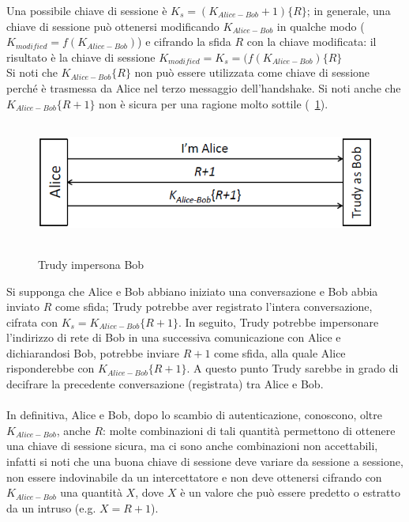 Una possibile chiave di sessione è $K_{s} = (K_{Alice-Bob}+1)\lbrace R\rbrace$; in generale, una chiave di sessione può ottenersi modificando $K_{Alice-Bob}$ in qualche modo ($K_{modified} = f(K_{Alice-Bob})$) e cifrando la sfida $R$ con la chiave modificata: il risultato è la chiave di sessione $K_{modified} = K_{s} = (f(K_{Alice-Bob})\lbrace R\rbrace$\\
Si noti che $K_{Alice-Bob}\lbrace R\rbrace$ non può essere utilizzata come chiave di sessione perché è trasmessa da Alice nel terzo messaggio dell'handshake.
Si noti anche che $K_{Alice-Bob}\lbrace R+1\rbrace$ non è sicura per una ragione molto sottile (\figurename~\ref{fig:ImgS65bis}).
\begin{figure}[htbp]
	\centering%
	\subfigure%
	{\includegraphics[height=4cm, width=12cm, keepaspectratio]{Immagini/autenticazione/ImgS65bis.png}}
	\caption{Trudy impersona Bob}\label{fig:ImgS65bis} 	
\end{figure}
Si supponga che Alice e Bob abbiano iniziato una conversazione e Bob abbia inviato $R$ come sfida; Trudy potrebbe aver registrato l'intera conversazione, cifrata con $K_{s} = K_{Alice-Bob}\lbrace R+1\rbrace$. In seguito, Trudy potrebbe impersonare l'indirizzo di rete di Bob in una successiva comunicazione con Alice e dichiarandosi Bob, potrebbe inviare $R+1$ come sfida, alla quale Alice risponderebbe con $K_{Alice-Bob}\lbrace R+1\rbrace$. A questo punto Trudy sarebbe in grado di decifrare la precedente conversazione (registrata) tra Alice e Bob.\\ \\
In definitiva, Alice e Bob, dopo lo scambio di autenticazione, conoscono, oltre $K_{Alice-Bob}$, anche $R$: molte combinazioni di tali quantità permettono di ottenere una chiave di sessione sicura, ma ci sono anche combinazioni non accettabili, infatti si noti che una buona chiave di sessione deve variare da sessione a sessione, non essere indovinabile da un intercettatore e non deve ottenersi cifrando con $K_{Alice-Bob}$ una quantità $X$, dove $X$ è un valore che può essere predetto o estratto da un intruso (e.g. $X = R + 1$).
